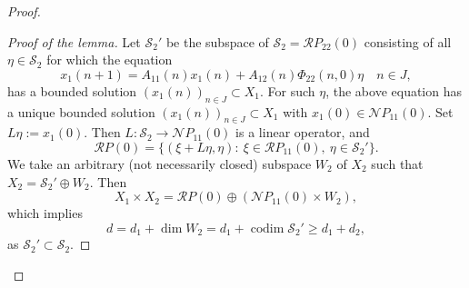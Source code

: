 \documentclass[11pt,reqno,a4paper]{amsart}
\theoremstyle{plain}
\numberwithin{equation}{section}
\theoremstyle{remark}
\DeclareMathOperator{\codim}{codim}
\begin{document}
\begin{proof}
\begin{proof}[Proof of the lemma]
Let $\mathcal S_2'$ be the subspace of $\mathcal S_2=\mathcal RP_{22}(0)$ consisting of all $\eta \in \mathcal S_2$ for which the equation
\begin{equation}\label{918eq}
x_1(n+1)=A_{11}(n)x_1(n)+A_{12}(n)\Phi_{22}(n, 0)\eta \quad n\in J,
\end{equation}
has a bounded solution $(x_1(n))_{n\in J}\subset X_1$.
For such $\eta$, the above equation has a unique bounded solution $(x_1(n))_{n\in J}\subset X_1$ with $x_1(0)\in \mathcal N P_{11}(0)$. Set $L\eta:=x_1(0)$. Then $L\colon \mathcal S_2\to \mathcal NP_{11}(0)$ is a linear operator, and
\[
\mathcal R P(0)=\{(\xi+L\eta, \eta): \ \xi\in \mathcal RP_{11}(0), \ \eta \in \mathcal S_2'\}.
\]
We take an arbitrary (not necessarily closed) subspace $W_2$ of $X_2$ such that $X_2=\mathcal S_2'\oplus W_2$. Then
\[ X_1\times X_2=\mathcal RP(0)\oplus (\mathcal NP_{11}(0)\times W_2), \] which implies
\begin{equation}\label{som}
d=d_1+\dim W_2=d_1+\codim \mathcal S_2'\ge d_1+d_2,
\end{equation}
as $\mathcal S_2'\subset \mathcal S_2$.
\end{proof}


\end{proof}
\end{document}
